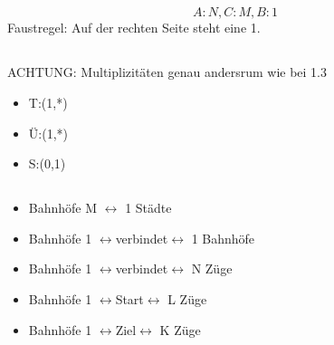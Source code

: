 \subsection{}
\begin{displaymath}
	A:N, C:M, B:1
\end{displaymath}
Faustregel: Auf der rechten Seite steht eine 1.
\subsection{}
ACHTUNG: Multiplizitäten genau andersrum wie bei 1.3
\begin{itemize}
	\item T:(1,*)
	\item Ü:(1,*)
	\item S:(0,1)
\end{itemize}
\subsection{}
\begin{itemize}
	\item Bahnhöfe M \(\leftrightarrow\) 1 Städte
	\item Bahnhöfe 1 \(\leftrightarrow\)verbindet\(\leftrightarrow\) 1 Bahnhöfe
	\item Bahnhöfe 1 \(\leftrightarrow\)verbindet\(\leftrightarrow\) N Züge
	\item Bahnhöfe 1 \(\leftrightarrow\)Start\(\leftrightarrow\) L Züge
	\item Bahnhöfe 1 \(\leftrightarrow\)Ziel\(\leftrightarrow\) K Züge
\end{itemize}
